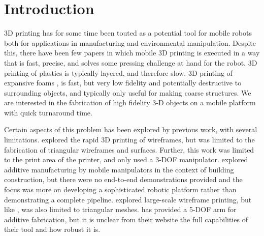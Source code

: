 \documentclass[conference]{acmsiggraph}
\begin{document}

\keywordlist


\TOGlinkslist


\copyrightspace

\section{Introduction}




3D printing has for some time been touted as a potential tool for mobile robots both for applications in manufacturing and environmental manipulation.  Despite this, there have been few papers in which mobile 3D printing is executed in a way that is fast, precise, and solves some pressing challenge at hand for the robot.  3D printing of plastics is typically layered, and therefore slow.  3D printing of expansive foams \cite{AirFoam}, \cite{RampFoam} is fast, but very low fidelity and potentially destructive to surrounding objects, and typically only useful for making coarse structures.  We are interested in the fabrication of high fidelity 3-D objects on a mobile platform with quick turnaround time.

Certain aspects of this problem has been explored by previous work, with several limitations.  \cite{WirePrint} explored the rapid 3D printing of wireframes, but was limited to the fabrication of triangular wireframes and surfaces.  Further, this work was limited to the print area of the printer, and only used a 3-DOF manipulator.  \cite{ArmFab} explored additive manufacturing by mobile manipulators in the context of building construction, but there were no end-to-end demonstrations provided and the focus was more on developing a sophisticated robotic platform rather than demonstrating a complete pipeline.  \cite{ArchFab} explored large-scale wireframe printing, but like \cite{WirePrint}, was also limited to triangular meshes.  \cite{Mataerial} has provided a 5-DOF arm for additive fabrication, but it is unclear from their website the full capabilities of their tool and how robust it is.
\end{document}
